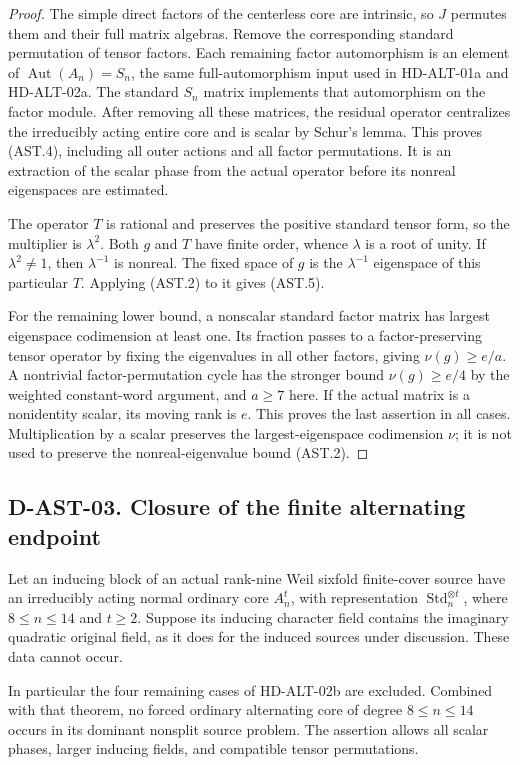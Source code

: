 \begin{proof}
The simple direct factors of the centerless core are intrinsic,
so $J$ permutes them and their full matrix algebras.  Remove
the corresponding standard permutation of tensor factors.
Each remaining factor automorphism is an element of
$\operatorname{Aut}(A_n)=S_n$, the same full-automorphism
input used in HD-ALT-01a and HD-ALT-02a.  The standard
$S_n$ matrix implements that automorphism on the factor
module.  After removing all these matrices, the residual
operator centralizes the irreducibly acting entire core and
is scalar by Schur's lemma.  This proves (AST.4), including
all outer actions and all factor permutations.  It is an
extraction of the scalar phase from the actual operator
before its nonreal eigenspaces are estimated.

The operator $T$ is rational and preserves the positive
standard tensor form, so the multiplier is $\lambda^2$.
Both $g$ and $T$ have finite order, whence $\lambda$ is a
root of unity.  If $\lambda^2\ne1$, then
$\lambda^{-1}$ is nonreal.  The fixed space of $g$ is the
$\lambda^{-1}$ eigenspace of this particular $T$.
Applying (AST.2) to it gives (AST.5).

For the remaining lower bound, a nonscalar standard factor
matrix has largest eigenspace codimension at least one.
Its fraction passes to a factor-preserving tensor operator
by fixing the eigenvalues in all other factors, giving
$\nu(g)\ge e/a$.  A nontrivial factor-permutation cycle
has the stronger bound $\nu(g)\ge e/4$ by the weighted
constant-word argument, and $a\ge7$ here.  If the actual
matrix is a nonidentity scalar, its moving rank is $e$.
This proves the last assertion in all cases.  Multiplication
by a scalar preserves the largest-eigenspace codimension
$\nu$; it is not used to preserve the nonreal-eigenvalue
bound (AST.2).
\end{proof}

\subsection*{D-AST-03. Closure of the finite alternating endpoint}

\begin{theorem}
\label{D-AST-03}
Let an inducing block of an actual rank-nine Weil sixfold
finite-cover source have an irreducibly acting normal ordinary
core $A_n^t$, with representation
$\operatorname{Std}_n^{\otimes t}$, where
$8\le n\le14$ and $t\ge2$.
Suppose its inducing character field contains the imaginary
quadratic original field, as it does for the induced sources
under discussion.  These data cannot occur.

In particular the four remaining cases of HD-ALT-02b are
excluded.  Combined with that theorem, no forced ordinary
alternating core of degree $8\le n\le14$ occurs in its
dominant nonsplit source problem.  The assertion allows all
scalar phases, larger inducing fields, and compatible tensor
permutations.
\end{theorem}

